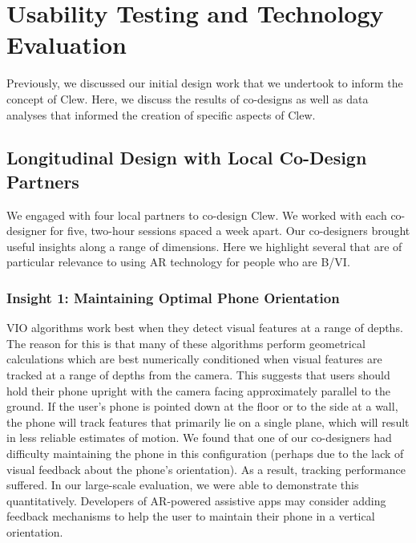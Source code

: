 \documentclass[chi_draft]{sigchi}
\newcommand{\BVI}{B/VI\xspace}
\begin{document}
\section{Usability Testing and Technology Evaluation}\label{sec:usabilityandevaluation}
Previously, we discussed our initial design work that we undertook to inform the concept of Clew.  Here, we discuss the results of co-designs as well as data analyses that informed the creation of specific aspects of Clew. %

\subsection{Longitudinal Design with Local Co-Design Partners}
We engaged with four local partners to co-design Clew.  We worked with each co-designer for five, two-hour sessions spaced a week apart.  Our co-designers brought useful insights along a range of dimensions.  Here we highlight several that are of particular relevance to using AR technology for people who are \BVI.

\subsubsection{Insight 1: Maintaining Optimal Phone Orientation}
VIO algorithms work best when they detect visual features at a range of depths.  The reason for this is that many of these algorithms perform geometrical calculations which are best numerically conditioned when visual features are tracked at a range of depths from the camera.  This suggests that users should hold their phone upright with the camera facing approximately parallel to the ground.  If the user's phone is pointed down at the floor or to the side at a wall, the phone will track features that primarily lie on a single plane, which will result in less reliable estimates of motion.  We found that one of our co-designers had difficulty maintaining the phone in this configuration (perhaps due to the lack of visual feedback about the phone's orientation).  As a result, tracking performance suffered.  In our large-scale evaluation, we were able to demonstrate this quantitatively.  Developers of AR-powered assistive apps may consider adding feedback mechanisms to help the user to maintain their phone in a vertical orientation.
\end{document}
